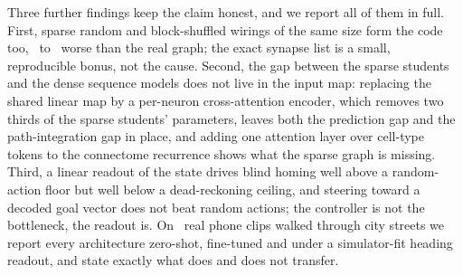 Three further findings keep the claim honest, and we report all of them in full. First, sparse random and
block-shuffled wirings of the same size form the code too, \nConnBlockGapArena\ to \nConnBlockGapArenaDarkSixteen\degree\ worse
than the real graph; the exact synapse list is a small, reproducible bonus, not the cause. Second, the gap between the
sparse students and the dense sequence models does not live in the input map: replacing the shared linear map by a
per-neuron cross-attention encoder, which removes two thirds of the sparse students' parameters, leaves both the
prediction gap and the path-integration gap in place, and adding one attention layer over cell-type tokens to the
connectome recurrence shows what the sparse graph is missing. Third, a linear readout of the state drives blind homing
well above a random-action floor but well below a dead-reckoning ceiling, and steering toward a decoded goal vector
does not beat random actions; the controller is not the bottleneck, the readout is. On \nRvClips\ real phone clips
walked through city streets we report every architecture zero-shot, fine-tuned and under a simulator-fit heading
readout, and state exactly what does and does not transfer.

